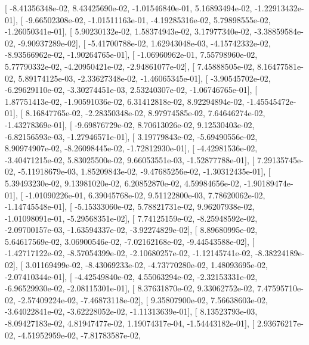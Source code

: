 \documentclass{article}
\begin{document}
       [ -8.41356348e-02,   8.43425690e-02,  -1.01546840e-01,
          5.16893494e-02,  -1.22913432e-01],
       [ -9.66502308e-02,  -1.01511163e-01,  -4.19285316e-02,
          5.79898555e-02,  -1.26050341e-01],
       [  5.90230132e-02,   1.58374943e-02,   3.17977340e-02,
         -3.38859584e-02,  -9.90937289e-02],
       [ -5.41700788e-02,   1.62943048e-03,  -4.15742332e-02,
         -8.93566962e-02,  -1.90264765e-01],
       [ -1.06960962e-01,   7.55798960e-02,   5.77790332e-02,
         -4.20950421e-02,  -2.94861077e-02],
       [  7.45888505e-02,   8.16477581e-02,   5.89174125e-03,
         -2.33627348e-02,  -1.46065345e-01],
       [ -3.90545702e-02,  -6.29629110e-02,  -3.30274451e-03,
          2.53240307e-02,  -1.06746765e-01],
       [  1.87751413e-02,  -1.90591036e-02,   6.31412818e-02,
          8.92294894e-02,  -1.45545472e-01],
       [  8.16847765e-02,  -2.28350348e-02,   8.97974585e-02,
          7.64646274e-02,  -1.43278369e-01],
       [ -9.69876729e-02,   8.70613026e-02,   9.12530403e-02,
         -6.82156593e-03,  -1.27946571e-01],
       [  3.19779843e-02,  -5.69490556e-02,   8.90974907e-02,
         -8.26098445e-02,  -1.72812930e-01],
       [ -4.42981536e-02,  -3.40471215e-02,   5.83025500e-02,
          9.66053551e-03,  -1.52877788e-01],
       [  7.29135745e-02,  -5.11918679e-03,   1.85209843e-02,
         -9.47685256e-02,  -1.30312435e-01],
       [  5.39493230e-02,   9.13981020e-02,   6.20852870e-02,
          4.59984656e-02,  -1.90189474e-01],
       [ -1.01090226e-01,   6.39045768e-02,   9.51122800e-03,
          7.78620062e-02,  -1.14745548e-01],
       [ -5.15333060e-02,   5.78821731e-02,   9.96207938e-02,
         -1.01098091e-01,  -5.29568351e-02],
       [  7.74125159e-02,  -8.25948592e-02,  -2.09700157e-03,
         -1.63594337e-02,  -3.92274829e-02],
       [  8.89680995e-02,   5.64617569e-02,   3.06900546e-02,
         -7.02162168e-02,  -9.44543588e-02],
       [ -1.42717122e-02,  -8.57054399e-02,  -2.10680257e-02,
         -1.12145741e-02,  -8.38224189e-02],
       [  3.01169499e-02,  -8.43069233e-02,  -4.73770280e-02,
          1.48093695e-02,  -2.07410344e-01],
       [ -4.42549840e-02,   4.55063294e-02,  -2.32153331e-02,
         -6.96529930e-02,  -2.08115301e-01],
       [  8.37631870e-02,   9.33062752e-02,   7.47595710e-02,
         -2.57409224e-02,  -7.46873118e-02],
       [  9.35807900e-02,   7.56638603e-02,  -3.64022841e-02,
         -3.62228052e-02,  -1.11313639e-01],
       [  8.13523793e-03,  -8.09427183e-02,   4.81947477e-02,
          1.19074317e-04,  -1.54443182e-01],
       [  2.93676217e-02,  -4.51952959e-02,  -7.81783587e-02,
\end{document}
